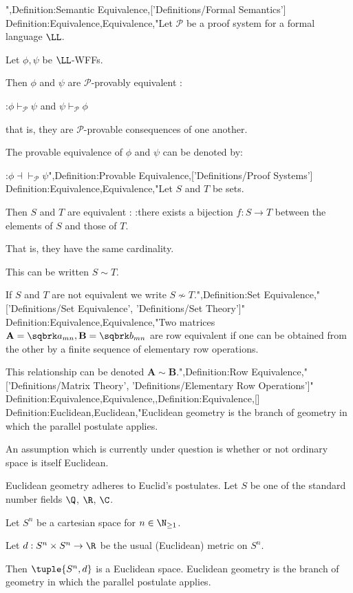",Definition:Semantic Equivalence,['Definitions/Formal Semantics']
Definition:Equivalence,Equivalence,"Let $\mathscr P$ be a proof system for a formal language $\LL$.

Let $\phi, \psi$ be $\LL$-WFFs.


Then $\phi$ and $\psi$ are $\mathscr P$-provably equivalent :

:$\phi \vdash_{\mathscr P} \psi$ and $\psi \vdash_{\mathscr P} \phi$

that is,  they are $\mathscr P$-provable consequences of one another.


The provable equivalence of $\phi$ and $\psi$ can be denoted by:

:$\phi \dashv \vdash_{\mathscr P} \psi$",Definition:Provable Equivalence,['Definitions/Proof Systems']
Definition:Equivalence,Equivalence,"Let $S$ and $T$ be sets.

Then $S$ and $T$ are equivalent :
:there exists a bijection $f: S \to T$ between the elements of $S$ and those of $T$.

That is,  they have the same cardinality.


This can be written $S \sim T$.


If $S$ and $T$ are not equivalent we write $S \nsim T$.",Definition:Set Equivalence,"['Definitions/Set Equivalence', 'Definitions/Set Theory']"
Definition:Equivalence,Equivalence,"Two matrices $\mathbf A = \sqbrk a_{m n}, \mathbf B = \sqbrk b_{m n}$ are row equivalent if one can be obtained from the other by a finite sequence of elementary row operations.

This relationship can be denoted $\mathbf A \sim \mathbf B$.",Definition:Row Equivalence,"['Definitions/Matrix Theory', 'Definitions/Elementary Row Operations']"
Definition:Equivalence,Equivalence,,Definition:Equivalence,[]
Definition:Euclidean,Euclidean,"Euclidean geometry is the branch of geometry in which the parallel postulate applies.

An assumption which is currently under question is whether or not ordinary space is itself Euclidean.


Euclidean geometry adheres to Euclid's postulates.
Let $S$ be one of the standard number fields $\Q$, $\R$, $\C$.

Let $S^n$ be a cartesian space for $n \in \N_{\ge 1}$.

Let $d: S^n \times S^n \to \R$ be the usual (Euclidean) metric on $S^n$.

Then $\tuple {S^n, d}$ is a Euclidean space.
Euclidean geometry is the branch of geometry in which the parallel postulate applies.

